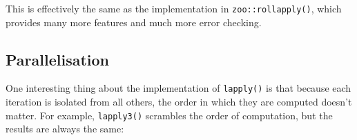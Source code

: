 \begin{Shaded}
\begin{Highlighting}[]
\StringTok{ }
\StringTok{ }\OperatorTok{/}\StringTok{ }\NormalTok{)}
\StringTok{ }\OperatorTok{+}\StringTok{ }\NormalTok{)}\OperatorTok{:}\NormalTok{(}\OperatorTok{-}\StringTok{ }\OperatorTok{+}\StringTok{ }\OperatorTok{+}\StringTok{ }\NormalTok{)}
\StringTok{ }\NormalTok{(}
    \NormalTok{(x[(i }\OperatorTok{-}\StringTok{ }\OperatorTok{:}\OperatorTok{+}\StringTok{ }\NormalTok{offset)], ...),}
    \NormalTok{(}\NormalTok{)}
\NormalTok{  )}

  \NormalTok{(}\NormalTok{(}
\NormalTok{\}}
\end{Highlighting}
\end{Shaded}

This is effectively the same as the implementation in
\texttt{zoo::rollapply()}, which provides many more features and much
more error checking.

\hypertarget{parallelisation}{%
\subsection{Parallelisation}\label{parallelisation}}

One interesting thing about the implementation of \texttt{lapply()} is
that because each iteration is isolated from all others, the order in
which they are computed doesn't matter. For example, \texttt{lapply3()}
scrambles the order of computation, but the results are always the same:
 

\begin{Shaded}
\begin{Highlighting}[]
\StringTok{ }
\StringTok{ }\NormalTok{(}\NormalTok{, }
   \NormalTok{(}
\StringTok{ }
\NormalTok{  \}}
\NormalTok{\}}
\NormalTok{(}\NormalTok{(}\OperatorTok{:}
\end{Highlighting}
\end{Shaded}

